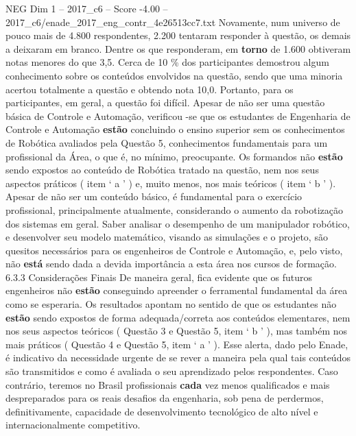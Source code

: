 \begin{textsample}{NEG Dim 1 – 2017\_c6 – Score -4.00 – 2017\_c6/enade\_2017\_eng\_contr\_4e26513cc7.txt}
Novamente, num universo de pouco mais de 4.800 respondentes, 2.200 tentaram responder à questão, os demais a deixaram em branco.
Dentre os que responderam, em \textbf{torno} de 1.600 obtiveram notas menores do que 3,5.
Cerca de 10 \% dos participantes demostrou algum conhecimento sobre os conteúdos envolvidos na questão, sendo que uma minoria acertou totalmente a questão e obtendo nota 10,0.
Portanto, para os participantes, em geral, a questão foi difícil.
Apesar de não ser uma questão básica de Controle e Automação, verificou -se que os estudantes de Engenharia de Controle e Automação \textbf{estão} concluindo o ensino superior sem os conhecimentos de Robótica avaliados pela Questão 5, conhecimentos fundamentais para um profissional da Área, o que é, no mínimo, preocupante.
Os formandos não \textbf{estão} sendo expostos ao conteúdo de Robótica tratado na questão, nem nos seus aspectos práticos ( item ‘ a ’ ) e, muito menos, nos mais teóricos ( item ‘ b ’ ).
Apesar de não ser um conteúdo básico, é fundamental para o exercício profissional, principalmente atualmente, considerando o aumento da robotização dos sistemas em geral.
Saber analisar o desempenho de um manipulador robótico, e desenvolver seu modelo matemático, visando as simulações e o projeto, são quesitos necessários para os engenheiros de Controle e Automação, e, pelo visto, não \textbf{está} sendo dada a devida importância a esta área nos cursos de formação. 6.3.3 Considerações Finais De maneira geral, fica evidente que os futuros engenheiros não \textbf{estão} conseguindo apreender o ferramental fundamental da área como se esperaria.
Os resultados apontam no sentido de que os estudantes não \textbf{estão} sendo expostos de forma adequada/correta aos conteúdos elementares, nem nos seus aspectos teóricos ( Questão 3 e Questão 5, item ‘ b ’ ), mas também nos mais práticos ( Questão 4 e Questão 5, item ‘ a ’ ).
Esse alerta, dado pelo Enade, é indicativo da necessidade urgente de se rever a maneira pela qual tais conteúdos são transmitidos e como é avaliada o seu aprendizado pelos respondentes.
Caso contrário, teremos no Brasil profissionais \textbf{cada} vez menos qualificados e mais despreparados para os reais desafios da engenharia, sob pena de perdermos, definitivamente, capacidade de desenvolvimento tecnológico de alto nível e internacionalmente competitivo.

\end{textsample}
